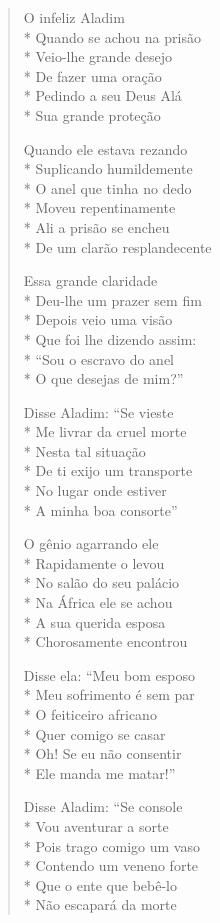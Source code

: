 \begin{verse}
O infeliz Aladim\\*
Quando se achou na prisão\\*
Veio-lhe grande desejo\\*
De fazer uma oração\\*
Pedindo a seu Deus Alá\\*
Sua grande proteção

Quando ele estava rezando\\*
Suplicando humildemente\\*
O anel que tinha no dedo\\*
Moveu repentinamente\\*
Ali a prisão se encheu\\*
De um clarão resplandecente

Essa grande claridade\\*
Deu-lhe um prazer sem fim\\*
Depois veio uma visão\\*
Que foi lhe dizendo assim:\\*
``Sou o escravo do anel\\*
O que desejas de mim?''

Disse Aladim: ``Se vieste\\*
Me livrar da cruel morte\\*
Nesta tal situação\\*
De ti exijo um transporte\\*
No lugar onde estiver\\*
A minha boa consorte''

O gênio agarrando ele\\*
Rapidamente o levou\\*
No salão do seu palácio\\*
Na África ele se achou\\*
A sua querida esposa\\*
Chorosamente encontrou

Disse ela: ``Meu bom esposo\\*
Meu sofrimento é sem par\\*
O feiticeiro africano\\*
Quer comigo se casar\\*
Oh! Se eu não consentir\\*
Ele manda me matar!''

Disse Aladim: ``Se console\\*
Vou aventurar a sorte\\*
Pois trago comigo um vaso\\*
Contendo um veneno forte\\*
Que o ente que bebê-lo\\*
Não escapará da morte


\end{verse}
